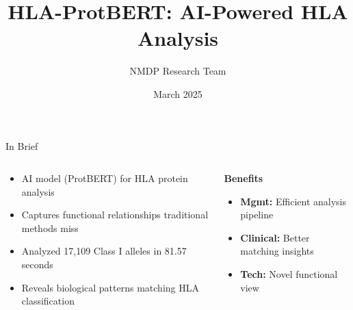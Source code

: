 \documentclass[aspectratio=169]{beamer}
\title[HLA-ProtBERT]{HLA-ProtBERT: AI-Powered HLA Analysis}
\author{NMDP Research Team}
\institute{National Marrow Donor Program}
\date{March 2025}
\newcommand{\formanagement}[1]{\textcolor{managementcolor}{\textbf{Mgmt:} #1}}
\newcommand{\forclinical}[1]{\textcolor{clinicalcolor}{\textbf{Clinical:} #1}}
\newcommand{\forbioinformatics}[1]{\textcolor{bioinfocolor}{\textbf{Tech:} #1}}
\begin{document}
\begin{frame}
  \titlepage
\end{frame}

\begin{frame}{In Brief}
  \begin{columns}
    \begin{column}{0.6\textwidth}
      \begin{itemize}
        \item AI model (ProtBERT) for HLA protein analysis
        \item Captures functional relationships traditional methods miss
        \item Analyzed 17,109 Class I alleles in 81.57 seconds
        \item Reveals biological patterns matching HLA classification
      \end{itemize}
    \end{column}
    \begin{column}{0.4\textwidth}
      \begin{tcolorbox}[colback=hlablue!5,colframe=hlablue]
      \textbf{Benefits}
      \begin{itemize}\small
        \item \formanagement{Efficient analysis pipeline}
        \item \forclinical{Better matching insights}
        \item \forbioinformatics{Novel functional view}
      \end{itemize}
      \end{tcolorbox}
    \end{column}
  \end{columns}
\end{frame}
\end{document}
